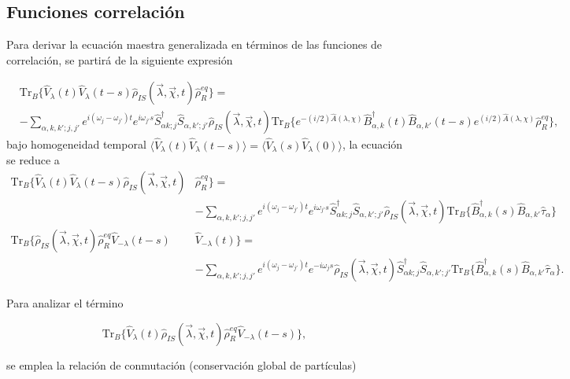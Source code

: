 \begin{appendixs}
\subsection{Funciones correlación}
Para derivar la ecuación maestra generalizada en términos de las funciones de correlación, se partirá de la siguiente expresión

\begin{align*}
& \text{Tr}_{B}\{ \hat{V}_{\lambda}(t)\hat{V}_{\lambda}(t-s) \hat{\rho}_{IS}(\vec{\lambda},\vec{\chi},t)\hat{\rho}^{eq}_{R} \}  =\\
&  - \sum_{\alpha,k,k';j,j'}e^{i(\omega_{j}-\omega_{j'})t}e^{i\omega_{j'}s}\hat{S}^{\dagger}_{\alpha k;j}\hat{S}_{\alpha,k';j'}\hat{\rho}_{IS}(\vec{\lambda},\vec{\chi},t)\text{Tr}_{B}\{e^{-(i/2)\hat{A}(\lambda,\chi)}\hat{B}^{\dagger}_{\alpha,k}(t)\hat{B}_{\alpha,k'}(t-s)e^{(i/2)\hat{A}(\lambda,\chi)}\hat{\rho}^{eq}_{R}\},
\end{align*}    
bajo homogeneidad temporal $\langle \hat{V}_{\lambda}(t)\hat{V}_{\lambda}(t-s) \rangle = \langle \hat{V}_{\lambda}(s)\hat{V}_{\lambda}(0) \rangle$, la ecuación se reduce a 
\begin{align*}
    \text{Tr}_{B}\{ \hat{V}_{\lambda}(t)\hat{V}_{\lambda}(t-s) \hat{\rho}_{IS}(\vec{\lambda},\vec{\chi},t)&\hat{\rho}^{eq}_{R} \}  = \\
    & - \sum_{\alpha,k,k';j,j'}e^{i(\omega_{j}-\omega_{j'})t}e^{i\omega_{j'}s}\hat{S}^{\dagger}_{\alpha k;j}\hat{S}_{\alpha,k';j'}\hat{\rho}_{IS}(\vec{\lambda},\vec{\chi},t)\text{Tr}_{B}\{\hat{B}^{\dagger}_{\alpha,k}(s)\hat{B}_{\alpha,k'}\hat{\tau}_{\alpha} \} \\
    \text{Tr}_{B}\{ \hat{\rho}_{IS}(\vec{\lambda},\vec{\chi},t)\hat{\rho}^{eq}_{R} \hat{V}_{-\lambda}(t-s)&\hat{V}_{-\lambda}(t) \}  = \\
    & - \sum_{\alpha,k,k';j,j'}e^{i(\omega_{j}-\omega_{j'})t}e^{-i\omega_{j}s}\hat{\rho}_{IS}(\vec{\lambda},\vec{\chi},t)\hat{S}^{\dagger}_{\alpha k;j}\hat{S}_{\alpha,k';j'} \text{Tr}_{B}\{ \hat{B}^{\dagger}_{\alpha,k}(s)\hat{B}_{\alpha,k'}\hat{\tau}_{\alpha} \}.   
\end{align*}    

Para analizar el término

\begin{equation*}
    \text{Tr}_{B}\{ \hat{V}_{\lambda}(t)\hat{\rho}_{IS}(\vec{\lambda},\vec{\chi},t)\hat{\rho}_{R}^{eq}\hat{V}_{-\lambda}(t-s) \},
\end{equation*}

se emplea la relación de conmutación (conservación global de partículas)


\end{appendixs}
